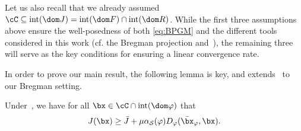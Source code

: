 \documentclass[11pt]{amsart}
\begin{document}
Let us also recall that we already assumed $\cC \subseteq \mathrm{int}(\dom J) = \mathrm{int}(\dom F) \cap \mathrm{int}(\dom R)$. While the first three assumptions above ensure the well-posedness of both \cref{eq:BPGM} and the different tools considered in this work (cf. the Bregman projection and~), the remaining three will serve as the key conditions for ensuring a linear convergence rate.

In order to prove our main result, the following lemma is key, and extends~\cite[Lemma 1]{zhang2015} to our Bregman setting.
\begin{lemma}\label{lem:nonsmooth_rrscconseqs} Under~, we have  for all $\bx \in \cC\cap \mathrm{int}(\dom \varphi)$ that 
\begin{equation}\label{eq:nonsmooth_bregman_gradient_domination}
    J(\bx) \geq \bar J+ \mu \alpha_\mathcal{S}(\varphi)D_{\varphi}(\bar\bx_{\varphi},\bx).
\end{equation}
\end{lemma}
\end{document}
